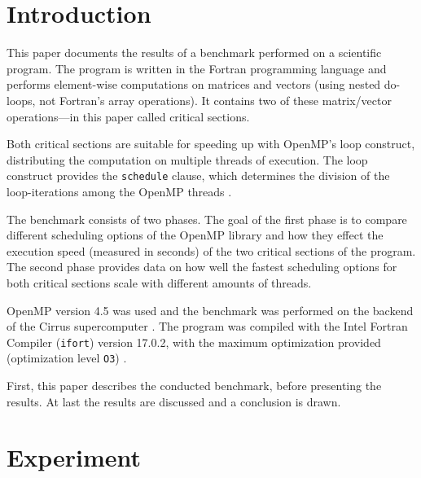 \documentclass[twoside,11pt]{article}
\title{\titl}
\author{\name Jonas Fassbender
        \email jonas@fassbender.dev}
\begin{document}
\maketitle

\begin{abstract}
\end{abstract}

\begin{keywords}
\end{keywords}

\section{Introduction} %

This paper documents the results of a benchmark performed
on a scientific program.
The program is written in the Fortran programming language
and performs element-wise computations on matrices and
vectors (using nested do-loops, not Fortran's array
operations).
It contains two of these matrix/vector operations---in this
paper called critical sections.

Both critical sections are suitable for speeding up with
OpenMP's loop construct, distributing the computation on
multiple threads of execution.
The loop construct provides the \texttt{schedule} clause,
which determines the division of the loop-iterations
among the OpenMP threads
\citep[see][Chapter 2.7.1]{openmp}.

The benchmark consists of two phases.
The goal of the first phase is to compare different
scheduling options of the OpenMP library and how they
effect the execution speed (measured in seconds) of the two
critical sections of the program.
The second phase provides data on how well the fastest
scheduling options for both critical sections scale with
different amounts of threads.

OpenMP version 4.5 was used and the benchmark was performed
on the backend of the Cirrus supercomputer
\citep[see][]{openmp, cirrus}.
The program was compiled with the Intel Fortran Compiler
(\texttt{ifort}) version 17.0.2, with the maximum
optimization provided (optimization level \texttt{O3})
\citep[see][]{ifort}.

First, this paper describes the conducted benchmark,
before presenting the results. At last the results are
discussed and a conclusion is drawn.


\section{Experiment} %
\end{document}
